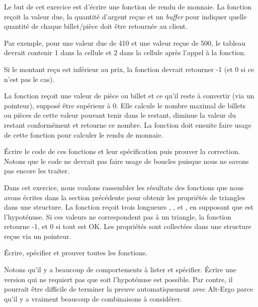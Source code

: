 





Le but de cet exercice est d'écrire une fonction de rendu de monnaie. La
fonction  reçoit la valeur due, la quantité
d'argent reçue et un \textit{buffer} pour indiquer quelle quantité de
chaque billet/pièce doit être retournée au client.


Par exemple, pour une valeur due de 410 et une valeur reçue de 500, le
tableau devrait contenir 1 dans la cellule  et
2 dans la cellule  après l'appel à la fonction.


Si le montant reçu est inférieur au prix, la fonction devrait retourner
-1 (et 0 si ce n'est pas le cas).




La fonction  reçoit une valeur de pièce ou
billet et ce qu'il reste à convertir (via un pointeur), supposé être
supérieur à 0. Elle calcule le nombre maximal de billets ou pièces de cette
valeur pouvant tenir dans le restant, diminue la valeur du restant
conformément et retourne ce nombre. La fonction 
doit ensuite faire usage de cette fonction pour calculer le rendu de
monnaie.


Écrire le code de ces fonctions et leur spécification puis prouver la
correction. Notons que le code ne devrait pas faire usage de boucles
puisque nous ne savons pas encore les traiter.






Dans cet exercice, nous voulons rassembler les résultats des fonctions
que nous avons écrites dans la section précédente pour obtenir les
propriétés de triangles dans une structure. La fonction
 reçoit trois longueurs ,
, et , en supposant que  est
l'hypoténuse. Si ces valeurs ne correspondent pas à un triangle, la
fonction retourne -1, et 0 si tout est OK. Les propriétés sont
collectées dans une structure  reçue via un pointeur.




Écrire, spécifier et prouver toutes les fonctions.

Notons qu'il y a beaucoup de comportements à lister et spécifier.
Écrire une version qui ne requiert pas que  soit
l'hypoténuse est possible. Par contre, il pourrait être difficile
de terminer la preuve automatiquement avec Alt-Ergo parce qu'il y a
vraiment beaucoup de combinaisons à considérer.


